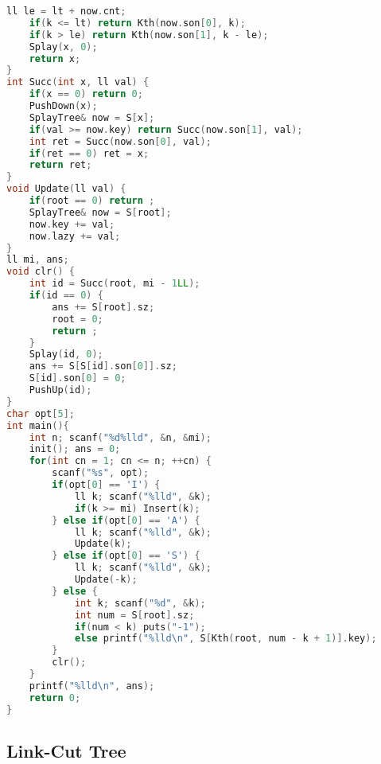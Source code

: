 \begin{lstlisting}[language=C++]
    ll le = lt + now.cnt;
    if(k <= lt) return Kth(now.son[0], k);
    if(k > le) return Kth(now.son[1], k - le);
    Splay(x, 0);
    return x;
}
int Succ(int x, ll val) {
    if(x == 0) return 0;
    PushDown(x);
    SplayTree& now = S[x];
    if(val >= now.key) return Succ(now.son[1], val);
    int ret = Succ(now.son[0], val);
    if(ret == 0) ret = x;
    return ret;
}
void Update(ll val) {
    if(root == 0) return ;
    SplayTree& now = S[root];
    now.key += val;
    now.lazy += val;
}
ll mi, ans;
void clr() {
    int id = Succ(root, mi - 1LL);
    if(id == 0) {
        ans += S[root].sz;
        root = 0;
        return ;
    }
    Splay(id, 0);
    ans += S[S[id].son[0]].sz;
    S[id].son[0] = 0;
    PushUp(id);
}
char opt[5];
int main(){
    int n; scanf("%d%lld", &n, &mi);
    init(); ans = 0;
    for(int cn = 1; cn <= n; ++cn) {
        scanf("%s", opt);
        if(opt[0] == 'I') {
            ll k; scanf("%lld", &k);
            if(k >= mi) Insert(k);
        } else if(opt[0] == 'A') {
            ll k; scanf("%lld", &k);
            Update(k);
        } else if(opt[0] == 'S') {
            ll k; scanf("%lld", &k);
            Update(-k);
        } else {
            int k; scanf("%d", &k);
            int num = S[root].sz;
            if(num < k) puts("-1");
            else printf("%lld\n", S[Kth(root, num - k + 1)].key);
        }
        clr();
    }
    printf("%lld\n", ans);
    return 0;
}
\end{lstlisting}

\subsection{Link-Cut Tree}

